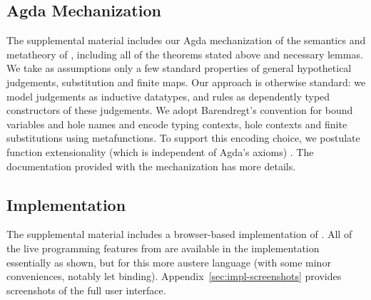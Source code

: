 

\subsection{Agda Mechanization}
\label{sec:agda-mechanization}
\vspace{-3px}

The supplemental material includes our Agda
mechanization  \cite{norell2009dependently,norell:thesis,Aydemir:2005fk}
of the semantics and metatheory of \HazelnutLive,
including all of the theorems stated above and necessary lemmas.
We take as assumptions only a few standard properties of general hypothetical judgements, substitution and finite maps.
%
%
%
%
%
Our approach is otherwise standard: we model judgements as
inductive datatypes, and rules as dependently typed constructors of these judgements.
%
We adopt Barendregt's convention for bound variables \cite{urban,barendregt84:_lambda_calculus} and hole names and encode typing
contexts, hole contexts and finite substitutions using metafunctions.
To support this encoding choice, we postulate function extensionality (which is independent of Agda's axioms) \cite{awodey2012inductive}.
The documentation provided with the mechanization has more details.

\subsection{Implementation}\label{sec:implementation}

The supplemental material includes a browser-based implementation
of \HazelnutLive.
All of the live programming features from  are available in the implementation essentially as shown, but for this more austere language (with some minor conveniences, notably let binding). Appendix~\ref{sec:impl-screenshots} provides screenshots of the full user interface.

